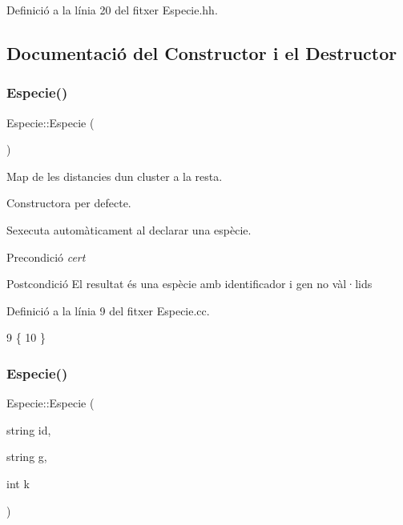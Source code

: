 Definició a la línia 20 del fitxer Especie.\+hh.



\subsection{Documentació del Constructor i el Destructor}
\mbox{\label{class_especie_a272c2488719cc9874b2f174906675b3d}} 
\subsubsection{\texorpdfstring{Especie()}{Especie()}\hspace{0.1cm}{\footnotesize\ttfamily [1/2]}}
{\footnotesize\ttfamily Especie\+::\+Especie (\begin{DoxyParamCaption}{ }\end{DoxyParamCaption})}



Map de les distancies d\textquotesingle{}un cluster a la resta. 

Constructora per defecte.

S\textquotesingle{}executa automàticament al declarar una espècie.

\begin{DoxyPrecond}{Precondició}
{\itshape cert} 
\end{DoxyPrecond}
\begin{DoxyPostcond}{Postcondició}
El resultat és una espècie amb identificador i gen no vàl·lids 
\end{DoxyPostcond}


Definició a la línia 9 del fitxer Especie.\+cc.


\begin{DoxyCode}
9                  \{
10 \}
\end{DoxyCode}
\mbox{\label{class_especie_a00df4e464c347052383d92d310f68791}} 
\subsubsection{\texorpdfstring{Especie()}{Especie()}\hspace{0.1cm}{\footnotesize\ttfamily [2/2]}}
{\footnotesize\ttfamily Especie\+::\+Especie (\begin{DoxyParamCaption}\item[{string}]{id,  }\item[{string}]{g,  }\item[{int}]{k }\end{DoxyParamCaption})}




